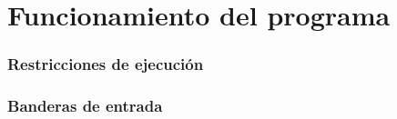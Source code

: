 \chapter{Funcionamiento del programa}

\subsection*{Restricciones de ejecución}

\subsection*{Banderas de entrada}



